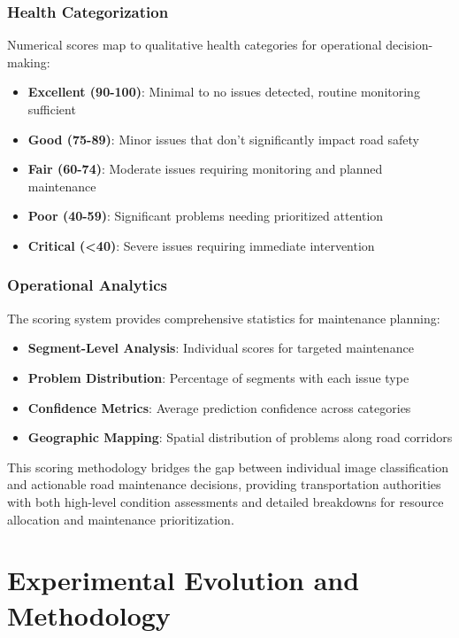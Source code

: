 \documentclass[12pt]{article}
\begin{document}
\subsubsection{Health Categorization}

Numerical scores map to qualitative health categories for operational decision-making:

\begin{itemize}[itemsep=1pt,parsep=0pt,topsep=3pt]
\item \textbf{Excellent (90-100)}: Minimal to no issues detected, routine monitoring sufficient
\item \textbf{Good (75-89)}: Minor issues that don't significantly impact road safety
\item \textbf{Fair (60-74)}: Moderate issues requiring monitoring and planned maintenance
\item \textbf{Poor (40-59)}: Significant problems needing prioritized attention
\item \textbf{Critical (<40)}: Severe issues requiring immediate intervention
\end{itemize}

\subsubsection{Operational Analytics}

The scoring system provides comprehensive statistics for maintenance planning:

\begin{itemize}[itemsep=1pt,parsep=0pt,topsep=3pt]
\item \textbf{Segment-Level Analysis}: Individual scores for targeted maintenance
\item \textbf{Problem Distribution}: Percentage of segments with each issue type
\item \textbf{Confidence Metrics}: Average prediction confidence across categories
\item \textbf{Geographic Mapping}: Spatial distribution of problems along road corridors
\end{itemize}

This scoring methodology bridges the gap between individual image classification and actionable road maintenance decisions, providing transportation authorities with both high-level condition assessments and detailed breakdowns for resource allocation and maintenance prioritization.

\section{Experimental Evolution and Methodology}
\end{document}
